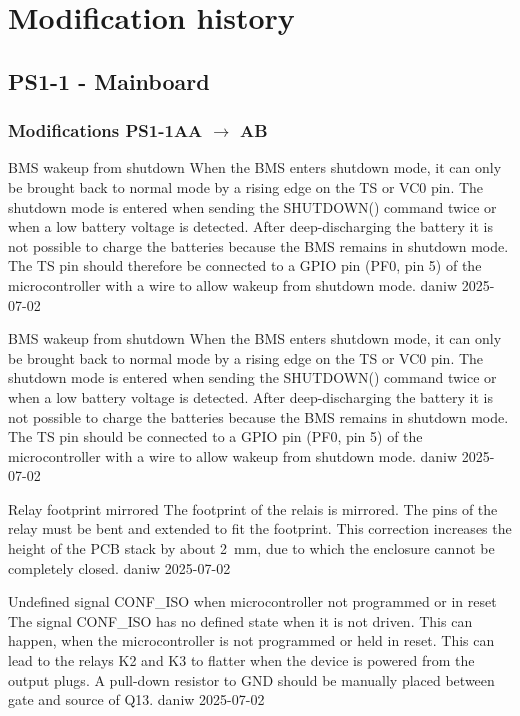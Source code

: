 \section{Modification history}

\subsection{PS1-1 - Mainboard}

\subsubsection{Modifications PS1-1AA $\to$ AB}

\begin{ModTable}

\ModItemDone
{BMS wakeup from shutdown}
{When the \ac{BMS} enters shutdown mode, it can only be brought back to normal mode by a rising edge on the TS or VC0 pin. The shutdown mode is entered when sending the SHUTDOWN() command twice or when a low battery voltage is detected. After deep-discharging the battery it is not possible to charge the batteries because the \ac{BMS} remains in shutdown mode. }
{The TS pin should therefore be connected to a GPIO pin (PF0, pin 5) of the microcontroller with a wire to allow wakeup from shutdown mode. }
{daniw}
{2025-07-02}

\ModItemDone
{BMS wakeup from shutdown}
{When the \ac{BMS} enters shutdown mode, it can only be brought back to normal mode by a rising edge on the TS or VC0 pin. The shutdown mode is entered when sending the SHUTDOWN() command twice or when a low battery voltage is detected. After deep-discharging the battery it is not possible to charge the batteries because the \ac{BMS} remains in shutdown mode. }
{The TS pin should be connected to a GPIO pin (PF0, pin 5) of the microcontroller with a wire to allow wakeup from shutdown mode. }
{daniw}
{2025-07-02}

\ModItemDone
{Relay footprint mirrored}
{The footprint of the relais is mirrored. }
{The pins of the relay must be bent and extended to fit the footprint. This correction increases the height of the PCB stack by about \qty{2}{\milli\meter}, due to which the enclosure cannot be completely closed. }
{daniw}
{2025-07-02}

\ModItemDone
{Undefined signal CONF\_ISO when microcontroller not programmed or in reset}
{The signal CONF\_ISO has no defined state when it is not driven. This can happen, when the microcontroller is not programmed or held in reset. This can lead to the relays K2 and K3 to flatter when the device is powered from the output plugs. }
{A pull-down resistor to GND should be manually placed between gate and source of Q13. }
{daniw}
{2025-07-02}


\end{ModTable}
